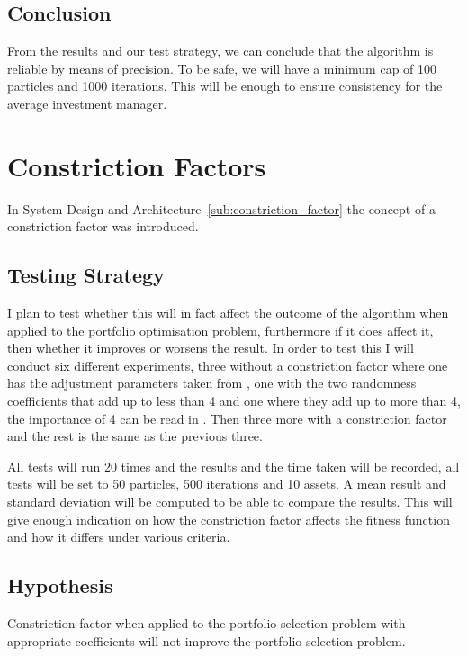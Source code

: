     \subsection{Conclusion} %
    \label{sub:conclusion}
    From the results and our test strategy, we can conclude that the algorithm is reliable by means of precision. To be safe, we will have a minimum cap of 100 particles and 1000 iterations. This will be enough to ensure consistency for the average investment manager.       

  \section{Constriction Factors} %
  \label{sec:constriction_factors}
  In System Design and Architecture~\ref{sub:constriction_factor} the concept of a constriction factor was introduced. 
    
    \subsection{Testing Strategy} %
    \label{sub:testing_strategy}
      I plan to test whether this will in fact affect the outcome of the algorithm when applied to the portfolio optimisation problem, furthermore if it does affect it, then whether it improves or worsens the result. In order to test this I will conduct six different experiments, three without a constriction factor where one has the adjustment parameters taken from \cite{constriction_factor_3}, one with the two randomness coefficients that add up to less than 4 and one where they add up to more than 4, the importance of 4 can be read in \cite{constriction_factor}. Then three more with a constriction factor and the rest is the same as the previous three.

      All tests will run 20 times and the results and the time taken will be recorded, all tests will be set to 50 particles, 500 iterations and 10 assets. A mean result and standard deviation will be computed to be able to compare the results. This will give enough indication on how the constriction factor affects the fitness function and how it differs under various criteria.  

    \subsection{Hypothesis} %
    \label{sub:hypothesis}
      Constriction factor when applied to the portfolio selection problem with appropriate coefficients will not improve the portfolio selection problem.


